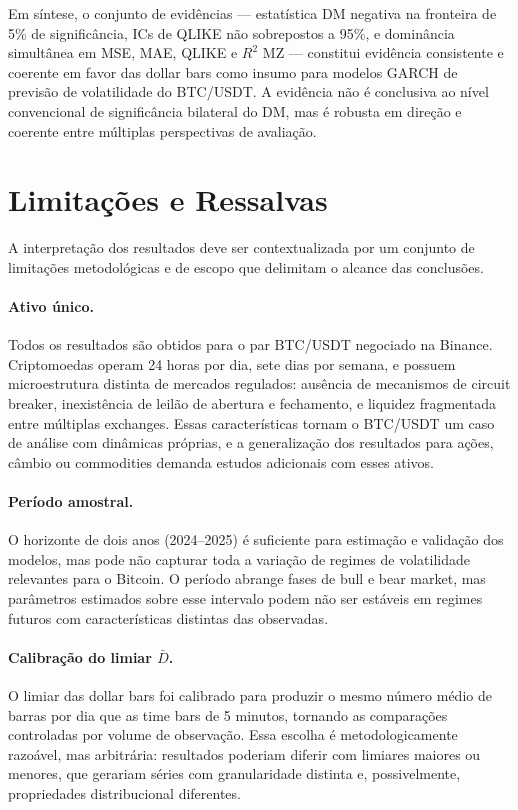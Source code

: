 Em síntese, o conjunto de evidências — estatística DM negativa na fronteira de 5\% de
significância, ICs de QLIKE não sobrepostos a 95\%, e dominância simultânea em MSE, MAE,
QLIKE e $R^2$ MZ — constitui evidência consistente e coerente em favor das dollar bars
como insumo para modelos GARCH de previsão de volatilidade do BTC/USDT. A evidência não
é conclusiva ao nível convencional de significância bilateral do DM, mas é robusta em
direção e coerente entre múltiplas perspectivas de avaliação.

\section{Limitações e Ressalvas}
\label{sec:limitacoes}

A interpretação dos resultados deve ser contextualizada por um conjunto de limitações
metodológicas e de escopo que delimitam o alcance das conclusões.

\paragraph{Ativo único.}
Todos os resultados são obtidos para o par BTC/USDT negociado na Binance.
Criptomoedas operam 24 horas por dia, sete dias por semana, e possuem microestrutura
distinta de mercados regulados: ausência de mecanismos de circuit breaker, inexistência
de leilão de abertura e fechamento, e liquidez fragmentada entre múltiplas exchanges.
Essas características tornam o BTC/USDT um caso de análise com dinâmicas próprias,
e a generalização dos resultados para ações, câmbio ou commodities demanda estudos
adicionais com esses ativos.

\paragraph{Período amostral.}
O horizonte de dois anos (2024–2025) é suficiente para estimação e validação dos modelos,
mas pode não capturar toda a variação de regimes de volatilidade relevantes para o Bitcoin.
O período abrange fases de bull e bear market, mas parâmetros estimados sobre esse intervalo
podem não ser estáveis em regimes futuros com características distintas das observadas.

\paragraph{Calibração do limiar $\bar{D}$.}
O limiar das dollar bars foi calibrado para produzir o mesmo número médio de barras por dia
que as time bars de 5 minutos, tornando as comparações controladas por volume de observação.
Essa escolha é metodologicamente razoável, mas arbitrária: resultados poderiam diferir com
limiares maiores ou menores, que gerariam séries com granularidade distinta e, possivelmente,
propriedades distribucional diferentes.

